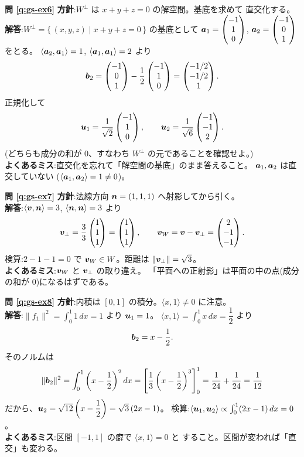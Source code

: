 \bigskip
\noindent\textbf{問 \ref{q:gs-ex6}}\quad
\textbf{方針}:$W^{\perp}$ は $x + y + z = 0$ の解空間。基底を求めて
直交化する。\\
\textbf{解答}:$W^{\perp} = \{\, (x, y, z) \mid x + y + z = 0 \,\}$ の基底として
$\bm{a}_1 = \begin{pmatrix}-1 \\ 1 \\ 0\end{pmatrix}$, $\bm{a}_2 = \begin{pmatrix}-1 \\ 0 \\ 1\end{pmatrix}$ をとる。
$\langle \bm{a}_2, \bm{a}_1 \rangle = 1$,
$\langle \bm{a}_1, \bm{a}_1 \rangle = 2$ より
\[
\bm{b}_2 = \begin{pmatrix}-1 \\ 0 \\ 1\end{pmatrix} - \frac{1}{2}\begin{pmatrix}-1 \\ 1 \\ 0\end{pmatrix}
= \begin{pmatrix}-1/2 \\ -1/2 \\ 1\end{pmatrix}.
\]
正規化して
\[
\bm{u}_1 = \frac{1}{\sqrt{2}}\begin{pmatrix}-1 \\ 1 \\ 0\end{pmatrix}, \qquad
\bm{u}_2 = \frac{1}{\sqrt{6}}\begin{pmatrix}-1 \\ -1 \\ 2\end{pmatrix}.
\]
(どちらも成分の和が $0$、すなわち $W^{\perp}$ の元であることを確認せよ。)\\
\textbf{よくあるミス}:直交化を忘れて「解空間の基底」のまま答えること。
$\bm{a}_1, \bm{a}_2$ は直交していない
($\langle \bm{a}_1, \bm{a}_2 \rangle = 1 \neq 0$)。

\bigskip
\noindent\textbf{問 \ref{q:gs-ex7}}\quad
\textbf{方針}:法線方向 $\bm{n} = (1, 1, 1)$ へ射影してから引く。\\
\textbf{解答}:$\langle \bm{v}, \bm{n} \rangle = 3$,
$\langle \bm{n}, \bm{n} \rangle = 3$ より
\[
\bm{v}_{\perp} = \frac{3}{3}\begin{pmatrix}1 \\ 1 \\ 1\end{pmatrix} = \begin{pmatrix}1 \\ 1 \\ 1\end{pmatrix}, \qquad
\bm{v}_W = \bm{v} - \bm{v}_{\perp} = \begin{pmatrix}2 \\ -1 \\ -1\end{pmatrix}.
\]
検算:$2 - 1 - 1 = 0$ で $\bm{v}_W \in W$。距離は
$\|\bm{v}_{\perp}\| = \sqrt{3}$。\\
\textbf{よくあるミス}:$\bm{v}_W$ と $\bm{v}_{\perp}$ の取り違え。
「平面への正射影」は平面の中の点(成分の和が $0$)になるはずである。

\bigskip
\noindent\textbf{問 \ref{q:gs-ex8}}\quad
\textbf{方針}:内積は $[0, 1]$ の積分。$\langle x, 1 \rangle \neq 0$ に注意。\\
\textbf{解答}:$\|f_1\|^2 = \int_0^1 1\,dx = 1$ より $\bm{u}_1 = 1$。
$\langle x, 1 \rangle = \int_0^1 x\,dx = \dfrac{1}{2}$ より
\[
\bm{b}_2 = x - \frac{1}{2}.
\]
そのノルムは
\[
\|\bm{b}_2\|^2 = \int_0^1 \left(x - \frac{1}{2}\right)^2 dx
= \left[\frac{1}{3}\left(x - \frac{1}{2}\right)^3\right]_0^1
= \frac{1}{24} + \frac{1}{24} = \frac{1}{12}
\]
だから、$\bm{u}_2 = \sqrt{12}\left(x - \dfrac{1}{2}\right)
= \sqrt{3}\,(2x - 1)$。
検算:$\langle \bm{u}_1, \bm{u}_2 \rangle
\propto \int_0^1 (2x - 1)\,dx = 0$。\\
\textbf{よくあるミス}:区間 $[-1, 1]$ の癖で $\langle x, 1 \rangle = 0$ と
すること。区間が変われば「直交」も変わる。

